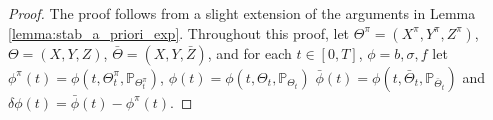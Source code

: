 \documentclass[11pt]{article}
\numberwithin{equation}{section}
\theoremstyle{definition}
\theoremstyle{remark}
\def\cN{\mathcal{N}}
\def\cS{\mathcal{S}}
\def\sN{{\mathbb{N}}}
\def\sP{\mathbb{P}}
\begin{document}
\begin{proof}%
The proof follows from a slight extension of the arguments in Lemma \ref{lemma:stab_a_priori_exp}.
Throughout this proof, 
let ${\Theta}^\pi=({X}^\pi, {Y}^\pi, {Z}^\pi)$,
%
$\Theta=(X, Y, Z)$,  
$\bar{\Theta}=({X}, {Y}, \bar{Z})$,
and for each $t\in [0,T]$, $\phi=b, \sigma, f$
let ${\phi}^\pi(t)= \phi(t, {\Theta}^\pi_t,\sP_{{\Theta}^\pi_t})$,
${\phi}(t)= \phi(t, {\Theta}_t,\sP_{{\Theta}_t})$
$\bar{\phi}(t)= \phi(t, \bar{\Theta}_t,\sP_{\bar{\Theta}_t})$
and 
$\delta {\phi}(t)=\bar{\phi}(t)- {\phi}^\pi(t)$.



\end{proof}
\end{document}
